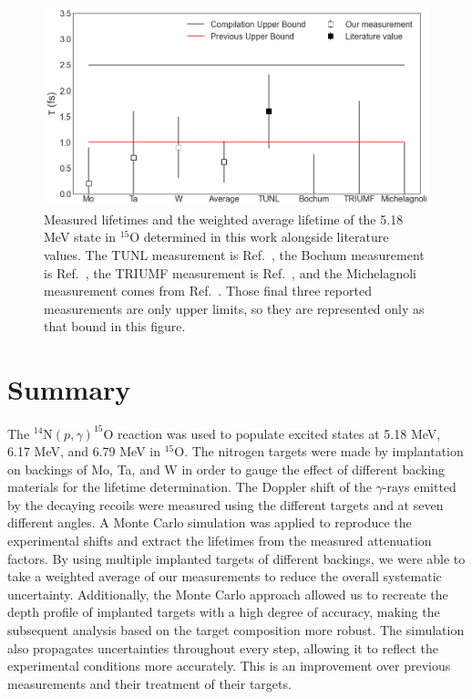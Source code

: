 \begin{figure}
\centering
\includegraphics[width=\linewidth]{figures/lifetimes679.png}
\caption{Measured lifetimes and the weighted average lifetime of the 5.18 MeV state in $^{15}$O determined in this work alongside literature values. The TUNL measurement is Ref.\ \cite{Bertone2001}, the Bochum measurement is Ref.\ \cite{Schurmann2008}, the TRIUMF measurement is Ref.\ \cite{Galinski2014}, and the Michelagnoli measurement comes from Ref.\ \cite{Michelagnoli2013}. Those final three reported measurements are only upper limits, so they are represented only as that bound in this figure.}
\label{fig: lifetimes679}
\end{figure}


\section{Summary}
\label{sec: lifetimeSummary}

The $^{14}$N$(p,\gamma)^{15}$O reaction was used to populate excited states at 5.18 MeV, 6.17 MeV, and 6.79 MeV in $^{15}$O. The nitrogen targets were made by implantation on backings of Mo, Ta, and W in order to gauge the effect of different backing materials for the lifetime determination. The Doppler shift of the $\gamma$-rays emitted by the decaying recoils were measured using the different targets and at seven different angles. A Monte Carlo simulation was applied to reproduce the experimental shifts and extract the lifetimes from the measured attenuation factors. By using multiple implanted targets of different backings, we were able to take a weighted average of our measurements to reduce the overall systematic uncertainty. Additionally, the Monte Carlo approach allowed us to recreate the depth profile of implanted targets with a high degree of accuracy, making the subsequent analysis based on the target composition more robust. The simulation also propagates uncertainties throughout every step, allowing it to reflect the experimental conditions more accurately. This is an improvement over previous measurements and their treatment of their targets.


